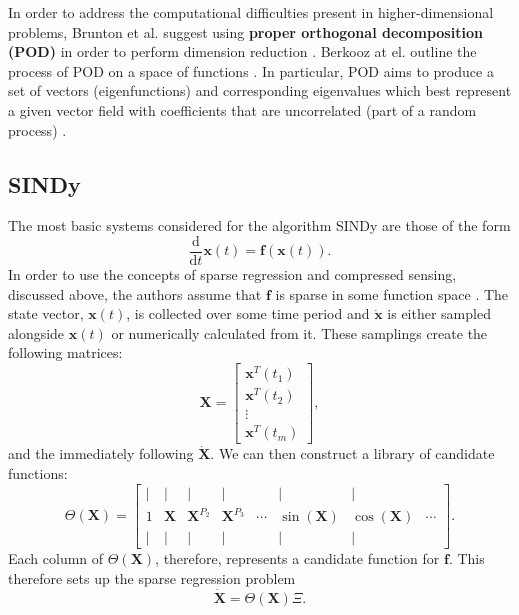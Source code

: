 \documentclass[10pt]{paper}
\begin{document}
In order to address the computational difficulties present in higher-dimensional problems, Brunton et al. suggest using \textbf{proper orthogonal decomposition (POD)} in order to perform dimension reduction \cite{sindy}. 
Berkooz at el. outline the process of POD on a space of functions \cite{berkooz}. In particular, POD aims to produce a set of vectors (eigenfunctions) and corresponding eigenvalues which best represent a given vector field with coefficients that are uncorrelated (part of a random process) \cite{berkooz}. 

\subsection{SINDy}
The most basic systems considered for the algorithm SINDy are those of the form 
\[ \frac{\mathrm d}{\mathrm dt} \boldsymbol x(t) = \boldsymbol f (\boldsymbol x(t)). \]
In order to use the concepts of sparse regression and compressed sensing, discussed above, the authors assume that $\boldsymbol f$ is sparse in some function space \cite{sindy}.
The state vector, $\boldsymbol x(t)$, is collected over some time period and $\boldsymbol {\dot x}$ is either sampled alongside $\boldsymbol x(t)$ or numerically calculated from it. 
These samplings create the following matrices: 
\[ \boldsymbol X = \begin{bmatrix}
	\boldsymbol x^T(t_1) \\ \boldsymbol x^T(t_2) \\ \vdots \\ \boldsymbol x^T(t_m)
\end{bmatrix}, \]  
and the immediately following $\boldsymbol {\dot X}$. We can then construct a library of candidate functions: 
\[  \Theta(\boldsymbol X) = \begin{bmatrix} \mid & \mid & \mid & \mid &  & \mid & \mid & \\ 1 & \boldsymbol X & {\boldsymbol X}^{P_2} & {\boldsymbol X}^{P_3} & \cdots & \sin{(\boldsymbol X)} & \cos{(\boldsymbol X)} & \cdots \\ \mid & \mid & \mid & \mid & & \mid & \mid & \end{bmatrix}.  \]
Each column of $\Theta(\boldsymbol X)$, therefore, represents a candidate function for $\boldsymbol f$. This therefore sets up the sparse regression problem 
\[ \boldsymbol {\dot X} = \Theta(\boldsymbol X)\Xi. \]










\newpage
\printbibliography
\end{document}
